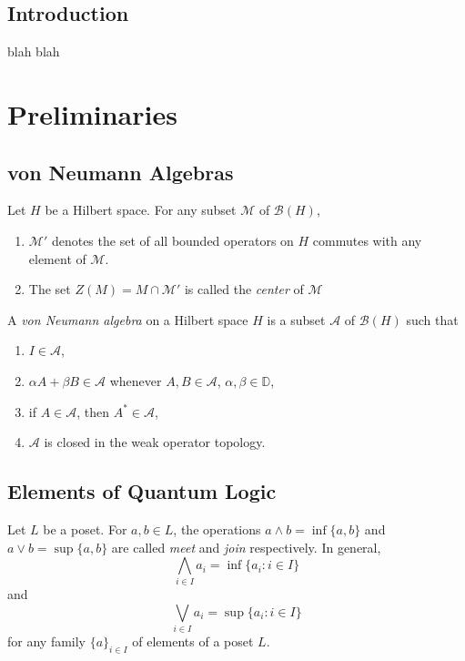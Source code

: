 
\section*{Introduction}
blah blah

\chapter{Preliminaries}

\section{von Neumann Algebras}
\begin{definition}
    Let \(H\) be a Hilbert space. For any subset \(\mathcal{M}\) of \(\mathcal{B}(H)\),
    \begin{enumerate}
        \item \(\mathcal{M}'\) denotes the set of all bounded operators on \(H\) commutes with any element of \(\mathcal{M}\).
        \item The set \(Z(M)=M \cap \mathcal{M}'\) is called the \emph{center} of \(\mathcal{M}\)
    \end{enumerate}
\end{definition}
    
\begin{definition}
    A \emph{von Neumann algebra} on a Hilbert space \(H\) is a subset \(\mathcal{A}\) of \(\mathcal{B}(H)\) such that
        \begin{enumerate}
            \item \(I \in \mathcal{A}\),
            \item \(\alpha A + \beta B \in \mathcal{A}\) whenever \(A,B \in \mathcal{A}\), \(\alpha,\beta \in \mathbb{D}\),
            \item if \(A \in \mathcal{A}\), then \(A^\ast \in \mathcal{A}\),
        \item \(\mathcal{A}\) is closed in the weak operator topology.
    \end{enumerate}
\end{definition}

\section{Elements of Quantum Logic}
Let \(L\) be a poset. For \(a,b \in L\), the operations \( a\wedge b = \inf \{a,b\}\) and \(a\vee b = \sup \{a,b\}\) are called \emph{meet} and \emph{join} respectively. In general, \[\bigwedge_{i\in I}a_i = \inf \{a_i : i \in I\}\] and \[\bigvee_{i \in I} a_i = \sup \{a_i : i \in I\}\] for any family \( \{a\}_{i \in I}\) of elements of a poset \(L\).

